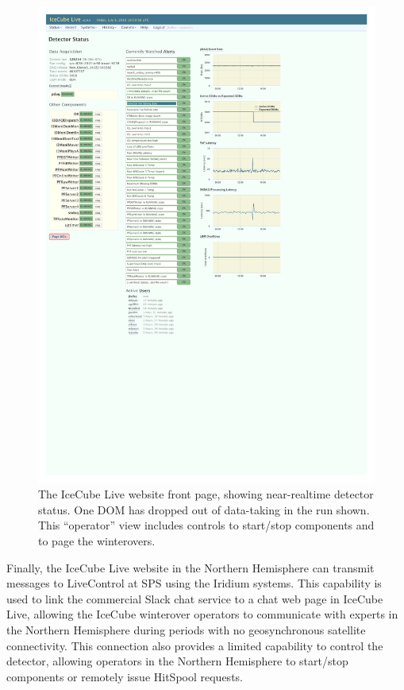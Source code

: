 \begin{figure}[!ht]
 \centering
 \includegraphics[width=1.0\textwidth]{graphics/online/live/live_screenshot_cropped.pdf}
 \caption{The IceCube Live website front page, showing near-realtime detector
   status.  One DOM has dropped out of data-taking in the run shown.  This
   ``operator'' view includes controls to start/stop components and to page
   the winterovers.} 
 \label{fig:live_screenshot}
\end{figure}

Finally, the IceCube Live website in the Northern Hemisphere can transmit
messages to LiveControl at SPS using the Iridium systems.  This capability
is used to link the commercial Slack chat service to a chat web page in
IceCube Live, allowing the IceCube winterover operators to communicate with
experts in the Northern Hemisphere during periods with no geosynchronous satellite
connectivity.  This connection also provides a limited capability to
control the detector, allowing operators in the Northern Hemisphere to
start/stop components or remotely issue HitSpool requests.

